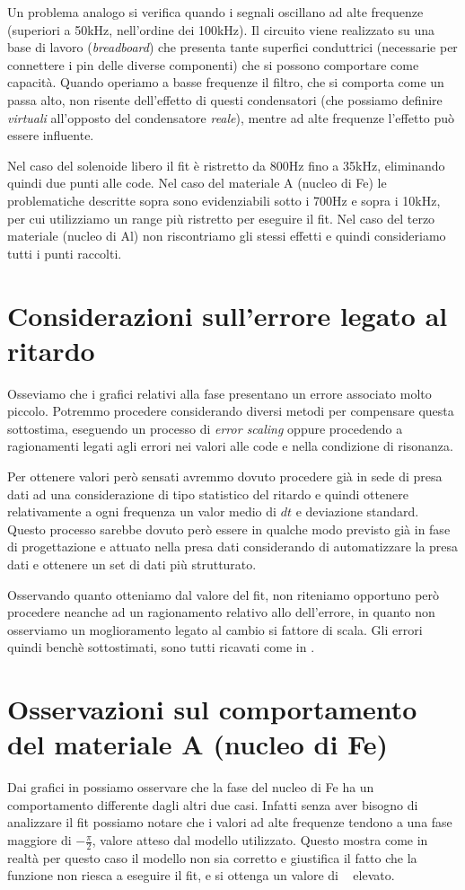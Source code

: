 \documentclass[
    rmp,
    floatfix,
    reprint, 
    superscriptaddress, 
    altaffilletter, 
    amsmath, 
    amssymb, 
    a4paper]{revtex4-2}
\begin{document}
Un problema analogo si verifica quando i segnali oscillano ad alte frequenze (superiori a 50kHz, nell'ordine dei 100kHz). Il circuito viene realizzato su una base di lavoro (\textit{breadboard}) che presenta tante superfici conduttrici (necessarie per connettere i pin delle diverse componenti) che si possono comportare come capacità. Quando operiamo a basse frequenze il filtro, che si comporta come un passa alto, non risente dell'effetto di questi condensatori (che possiamo definire \textit{virtuali} all'opposto del condensatore \textit{reale}), mentre ad alte frequenze l'effetto può essere influente. 

Nel caso del solenoide libero il fit è ristretto da 800Hz fino a 35kHz, eliminando quindi due punti alle code. Nel caso del materiale A (nucleo di Fe) le problematiche descritte sopra sono evidenziabili sotto i 700Hz e sopra i 10kHz, per cui utilizziamo un range più ristretto per eseguire il fit. Nel caso del terzo materiale (nucleo di Al) non riscontriamo gli stessi effetti e quindi consideriamo tutti i punti raccolti. 

\section*{Considerazioni sull'errore legato al ritardo}
Osseviamo che i grafici relativi alla fase presentano un errore associato molto piccolo. Potremmo procedere considerando diversi metodi per compensare questa sottostima, eseguendo un processo di \textit{error scaling} oppure procedendo a ragionamenti legati agli errori nei valori alle code e nella condizione di risonanza. 

Per ottenere valori però sensati avremmo dovuto procedere già in sede di presa dati ad una considerazione di tipo statistico del ritardo e quindi ottenere relativamente a ogni frequenza un valor medio di $dt$ e deviazione standard. Questo processo sarebbe dovuto però essere in qualche modo previsto già in fase di progettazione e attuato nella presa dati considerando di automatizzare la presa dati e ottenere un set di dati più strutturato. 

Osservando quanto otteniamo dal valore del fit, non riteniamo opportuno però procedere neanche ad un ragionamento relativo allo  dell'errore, in quanto non osserviamo un moglioramento legato al cambio si fattore di scala. Gli errori quindi benchè sottostimati, sono tutti ricavati come in .


\section*{Osservazioni sul comportamento del materiale A (nucleo di F\lowercase{e})}
Dai grafici in  possiamo osservare che la fase del nucleo di Fe ha un comportamento differente dagli altri due casi. Infatti senza aver bisogno di analizzare il fit possiamo notare che i valori ad alte frequenze tendono a una fase maggiore di $-\frac{\pi}{2}$, valore atteso dal modello utilizzato. Questo mostra come in realtà per questo caso il modello non sia corretto e giustifica il fatto che la funzione non riesca a eseguire il fit, e si ottenga un valore di \ChiNdf~ elevato. 
\end{document}

